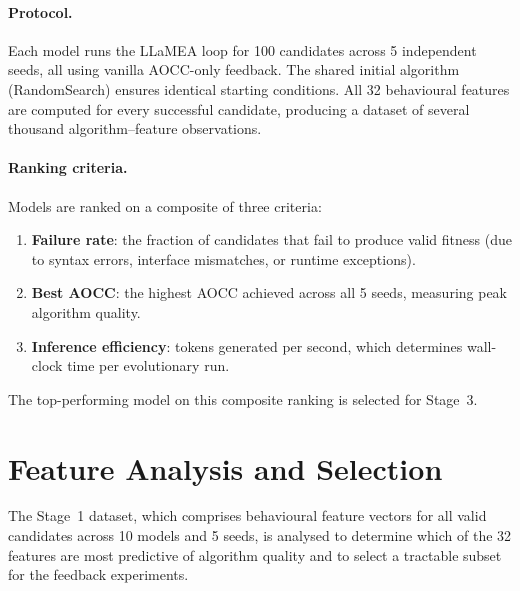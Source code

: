 \paragraph{Protocol.}
Each model runs the LLaMEA loop for 100 candidates across 5 independent seeds, all using vanilla AOCC-only feedback. The shared initial algorithm (RandomSearch) ensures identical starting conditions. All 32 behavioural features are computed for every successful candidate, producing a dataset of several thousand algorithm--feature observations.

\paragraph{Ranking criteria.}
Models are ranked on a composite of three criteria:
\begin{enumerate}
  \item \textbf{Failure rate}: the fraction of candidates that fail to produce valid fitness (due to syntax errors, interface mismatches, or runtime exceptions).
  \item \textbf{Best AOCC}: the highest AOCC achieved across all 5 seeds, measuring peak algorithm quality.
  \item \textbf{Inference efficiency}: tokens generated per second, which determines wall-clock time per evolutionary run.
\end{enumerate}
The top-performing model on this composite ranking is selected for Stage~3.

\section{Feature Analysis and Selection}
\label{sec:meth-feature-selection}

The Stage~1 dataset, which comprises behavioural feature vectors for all valid candidates across 10 models and 5 seeds, is analysed to determine which of the 32 features are most predictive of algorithm quality and to select a tractable subset for the feedback experiments.


